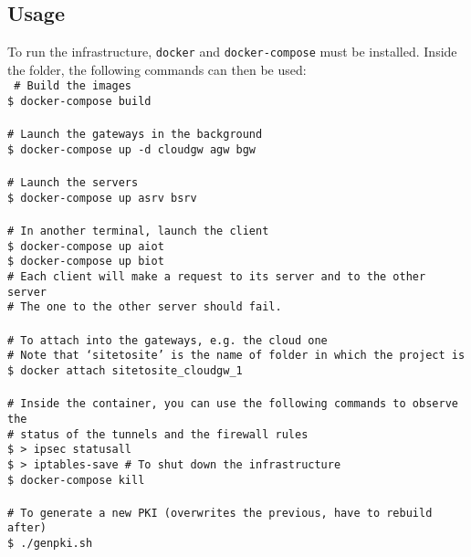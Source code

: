 \documentclass[paper=a4, fontsize=11pt]{scrartcl}
\begin{document}
\subsection{Usage}

To run the infrastructure, \texttt{docker} and \texttt{docker-compose} must be
installed.
Inside the folder, the following commands can then be used:\\
\texttt{%
    \# Build the images \\
    \$ docker-compose build
    \\ \\
    \# Launch the gateways in the background \\
    \$ docker-compose up -d cloudgw agw bgw
    \\ \\
    \# Launch the servers \\
    \$ docker-compose up asrv bsrv
    \\ \\
    \# In another terminal, launch the client \\
    \$ docker-compose up aiot \\
    \$ docker-compose up biot \\
    \# Each client will make a request to its server and to the other server \\
    \# The one to the other server should fail.
    \\ \\
    \# To attach into the gateways, e.g.\ the cloud one \\
    \# Note that `sitetosite' is the name of folder in which the project is \\
    \$ docker attach sitetosite\_cloudgw\_1
    \\ \\
    \# Inside the container, you can use the following commands to observe the \\
    \# status of the tunnels and the firewall rules \\
    \$ > ipsec statusall \\
    \$ > iptables-save
    \# To shut down the infrastructure \\
    \$ docker-compose kill
    \\ \\
    \# To generate a new PKI (overwrites the previous, have to rebuild after) \\
    \$~./genpki.sh
}
\end{document}

